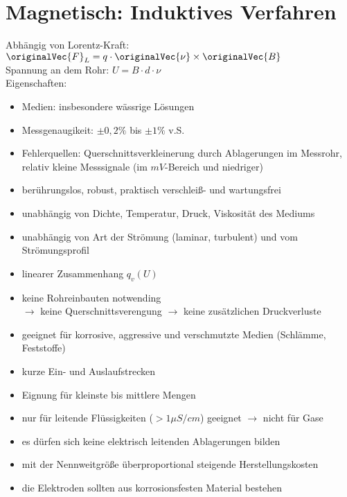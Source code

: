\section{Magnetisch: Induktives Verfahren}
Abhängig von Lorentz-Kraft: $\originalVec{F}_L=q\cdot \originalVec{\nu} \times \originalVec{B}$\\
Spannung an dem Rohr: $U=B\cdot d \cdot \nu$\\
Eigenschaften:
\begin{itemize}
\item Medien: insbesondere wässrige Lösungen
\item Messgenaugikeit: $\pm 0,2\%$ bis $\pm 1\%$ v.S.
\item Fehlerquellen: Querschnittsverkleinerung durch Ablagerungen im Messrohr, relativ kleine Messsignale (im $\unit{mV}$-Bereich und niedriger)
\end{itemize}
\begin{itemize}[label=$+$]
\item berührungslos, robust, praktisch verschleiß- und wartungsfrei
\item unabhängig von Dichte, Temperatur, Druck, Viskosität des Mediums
\item unabhängig von Art der Strömung (laminar, turbulent) und vom Strömungsprofil
\item linearer Zusammenhang $q_v(U)$
\item keine Rohreinbauten notwending\\
$\to$  keine Querschnittsverengung $\to$ keine zusätzlichen Druckverluste
\item geeignet für korrosive, aggressive und verschmutzte Medien (Schlämme, Feststoffe)
\item kurze Ein- und Auslaufstrecken
\item Eignung für kleinste bis mittlere Mengen
\end{itemize}
\begin{itemize}[label=$-$]
\item nur für leitende Flüssigkeiten ($> 1 \unit{\mu S/cm}$) geeignet $\to$ nicht für Gase
\item es dürfen sich keine elektrisch leitenden Ablagerungen bilden
\item mit der Nennweitgröße überproportional steigende Herstellungskosten
\item die Elektroden sollten aus korrosionsfesten Material bestehen
\end{itemize}

